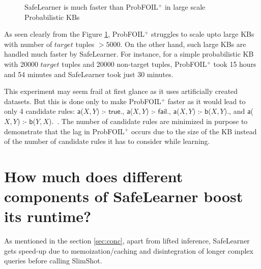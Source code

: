 \documentclass[akbc,twoside,11pt]{article}
\newcommand{\arcchit}[1]{\textcolor{red}{A: {#1}}}
\newcommand{\algorithmname}{SafeLearner\xspace}
\begin{document}
\begin{figure}[H]
\begin{center}
    \caption{\algorithmname is much faster than ProbFOIL$^+$ in large scale Probabilistic KBs}\label{fig:scaleup}
\end{center}
\end{figure}

As seen clearly from the Figure \ref{fig:scaleup}, ProbFOIL$^+$ struggles to scale upto large KBs with number of $target$ tuples $> 5000$. On the other hand, such large KBs are handled much faster by \algorithmname. For instance, for a simple probabilistic KB with 20000 $target$ tuples and 20000 non-target tuples, ProbFOIL$^+$ took 15 hours and 54 minutes and \algorithmname took just 30 minutes. 

This experiment may seem frail at first glance as it uses artificially created datasets. But this is done only to make ProbFOIL$^+$ faster as it would lead to only 4 candidate rules: $\mathsf{a}$($X, Y$) :- $\mathsf{true}$., $\mathsf{a}$($X, Y$) :- $\mathsf{fail}$., $\mathsf{a}$($X, Y$) :- $\mathsf{b}$($X, Y$)., and $\mathsf{a}$($X, Y$) :- $\mathsf{b}$($Y, X$).\ . The number of candidate rules are minimized in purpose to demonstrate that the lag in ProbFOIL$^+$ occurs due to the size of the KB instead of the number of candidate rules it has to consider while learning.

\section{How much does different components of \algorithmname boost its runtime?}\label{appendix:4}

As mentioned in the section \ref{sec:conc}, apart from lifted inference, \algorithmname gets speed-up due to memoization/caching and disintegration of longer complex queries before calling SlimShot.
\end{document}
